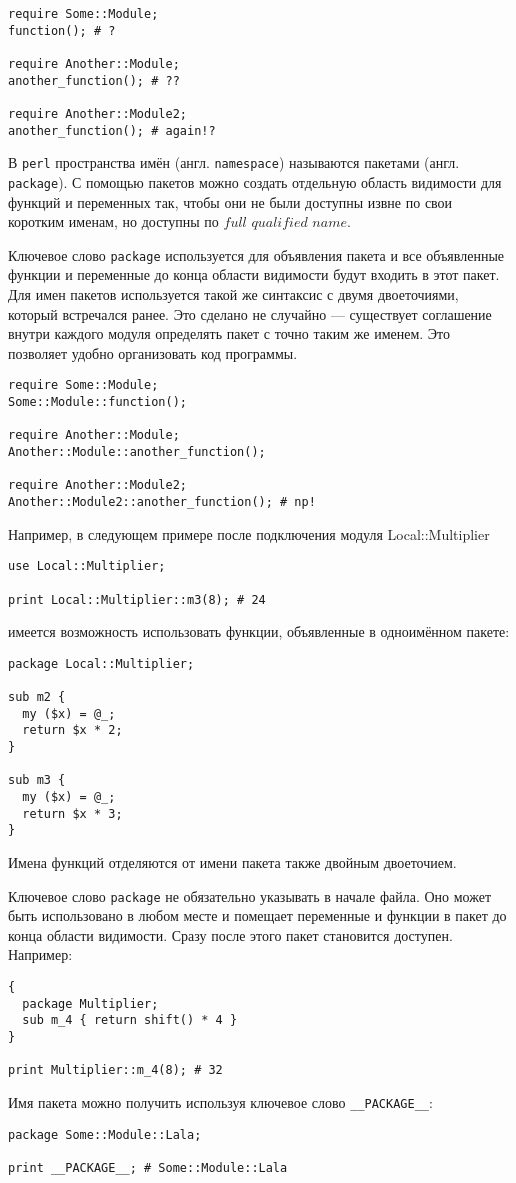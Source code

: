 \begin{verbatim}
require Some::Module;
function(); # ?

require Another::Module;
another_function(); # ??

require Another::Module2;
another_function(); # again!?
\end{verbatim}

В \verb|perl| пространства имён (англ. \verb|namespace|) называются пакетами (англ. \verb|package|). С помощью пакетов можно создать отдельную область видимости для функций и переменных так, чтобы они не были доступны извне по свои коротким именам, но доступны по $full$ $qualified$ $name$.

Ключевое слово \verb|package| используется для объявления пакета и все объявленные функции и переменные до конца области видимости будут входить в этот пакет.
Для имен пакетов используется такой же синтаксис с двумя двоеточиями, который встречался ранее. Это сделано не случайно --- существует соглашение внутри каждого модуля определять пакет с точно таким же именем. Это позволяет удобно организовать код программы.
\begin{verbatim}
require Some::Module;
Some::Module::function();

require Another::Module;
Another::Module::another_function();

require Another::Module2;
Another::Module2::another_function(); # np!
\end{verbatim}

Например, в следующем примере после подключения модуля Local::Multiplier
\begin{verbatim}
use Local::Multiplier;

print Local::Multiplier::m3(8); # 24
\end{verbatim}
имеется возможность использовать функции, объявленные в одноимённом пакете:
\begin{verbatim}
package Local::Multiplier;

sub m2 {
  my ($x) = @_;
  return $x * 2;
}

sub m3 {
  my ($x) = @_;
  return $x * 3;
}
\end{verbatim}
Имена функций отделяются от имени пакета также двойным двоеточием.

Ключевое слово \verb|package| не обязательно указывать в начале файла. Оно может быть использовано в любом месте и помещает переменные и функции в пакет до конца области видимости. Сразу после этого пакет становится доступен. Например:
\begin{verbatim}
{
  package Multiplier;
  sub m_4 { return shift() * 4 }
}

print Multiplier::m_4(8); # 32
\end{verbatim}
 Имя пакета можно получить используя ключевое слово \verb|__PACKAGE__|:
\begin{verbatim}
package Some::Module::Lala;

print __PACKAGE__; # Some::Module::Lala
\end{verbatim}

